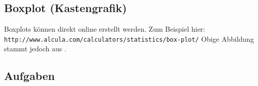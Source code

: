 \newpage

\subsection{Boxplot (Kastengrafik)}


Boxplots können direkt online erstellt werden. Zum Beispiel hier:\\
\texttt{http://www.alcula.com/calculators/statistics/box-plot/}
Obige Abbildung stammt jedoch aus \cite{frommenwiler17alg}.

\subsection*{Aufgaben}


